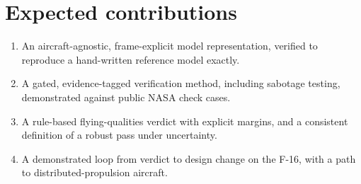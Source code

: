 \documentclass[11pt]{article}
\begin{document}
\section*{Expected contributions}
\begin{enumerate}[label=C\arabic*.]
  \item An aircraft-agnostic, frame-explicit model representation, verified to
    reproduce a hand-written reference model exactly.
  \item A gated, evidence-tagged verification method, including sabotage
    testing, demonstrated against public NASA check cases.
  \item A rule-based flying-qualities verdict with explicit margins, and a
    consistent definition of a robust pass under uncertainty.
  \item A demonstrated loop from verdict to design change on the F-16, with a
    path to distributed-propulsion aircraft.
\end{enumerate}
\end{document}
